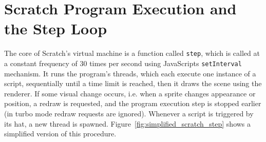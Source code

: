 \section{Scratch Program Execution and the Step Loop}
\label{sec:scratch_program_execution_and_the_step_loop}

The core of Scratch's virtual machine is a function called \texttt{step},
which is called at a constant frequency of 30 times per second using JavaScripts \texttt{setInterval} mechanism.
It runs the program's threads, which each execute one instance of a script, sequentially until a time limit is reached, then it draws the scene using the renderer.
If some visual change occurs, i.e. when a sprite changes appearance or position, a redraw is requested,
and the program execution step is stopped earlier (in turbo mode redraw requests are ignored).
Whenever a script is triggered by its hat, a new thread is spawned.
Figure~\ref{fig:simplified_scratch_step} shows a simplified version of this procedure.
\parspace


